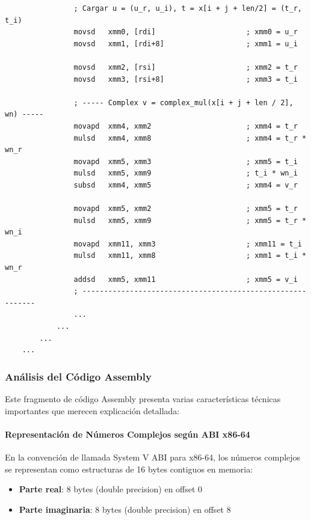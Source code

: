 \documentclass[a4paper]{article}
\begin{document}
\begin{verbatim}
                ; Cargar u = (u_r, u_i), t = x[i + j + len/2] = (t_r, t_i)
                movsd   xmm0, [rdi]                     ; xmm0 = u_r
                movsd   xmm1, [rdi+8]                   ; xmm1 = u_i

                movsd   xmm2, [rsi]                     ; xmm2 = t_r
                movsd   xmm3, [rsi+8]                   ; xmm3 = t_i

                ; ----- Complex v = complex_mul(x[i + j + len / 2], wn) -----
                movapd  xmm4, xmm2                      ; xmm4 = t_r
                mulsd   xmm4, xmm8                      ; xmm4 = t_r * wn_r
                movapd  xmm5, xmm3                      ; xmm5 = t_i
                mulsd   xmm5, xmm9                      ; t_i * wn_i
                subsd   xmm4, xmm5                      ; xmm4 = v_r

                movapd  xmm5, xmm2                      ; xmm5 = t_r
                mulsd   xmm5, xmm9                      ; xmm5 = t_r * wn_i
                movapd  xmm11, xmm3                     ; xmm11 = t_i
                mulsd   xmm11, xmm8                     ; xmm1 = t_i * wn_r
                addsd   xmm5, xmm11                     ; xmm5 = v_i
                ; -----------------------------------------------------------
                ...
            ...
        ...
    ...
\end{verbatim}

\subsubsection{Análisis del Código Assembly}

Este fragmento de código Assembly presenta varias características técnicas importantes que merecen explicación detallada:

\paragraph{Representación de Números Complejos según ABI x86-64}

En la convención de llamada System V ABI para x86-64, los números complejos se representan como estructuras de 16 bytes contiguos en memoria:

\begin{itemize}
    \item \textbf{Parte real}: 8 bytes (double precision) en offset 0
    \item \textbf{Parte imaginaria}: 8 bytes (double precision) en offset 8
\end{itemize}
\end{document}
